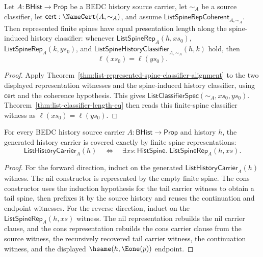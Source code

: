 \begin{theorem}
\label{thm:list-spine-classifier-represented-length}
Let $A:\mathsf{BHist}\to\mathsf{Prop}$ be a BEDC history source carrier, let
$\sim_A$ be a source classifier, let $\mathsf{cert}:\NameCert(A,\sim_A)$, and
assume $\mathsf{ListSpineRepCoherent}_{A,\sim_A}$. Then represented finite spines have equal presentation length along the spine-induced history classifier: whenever $\mathsf{ListSpineRep}_A(h,xs_0)$, $\mathsf{ListSpineRep}_A(k,ys_0)$, and $\mathsf{ListSpineHistoryClassifier}_{A,\sim_A}(h,k)$ hold, then
$$
\ell(xs_0)=\ell(ys_0).
$$
\end{theorem}
\begin{proof}
Apply Theorem~\ref{thm:list-represented-spine-classifier-alignment} to the two
displayed representation witnesses and the spine-induced history classifier,
using $\mathsf{cert}$ and the coherence hypothesis. This gives
$\mathsf{ListClassifierSpec}(\sim_A,xs_0,ys_0)$. Theorem~\ref{thm:list-classifier-length-eq}
then reads this finite-spine classifier witness as $\ell(xs_0)=\ell(ys_0)$.
\end{proof}

\begin{theorem}
\label{thm:list-spine-representation-coverage}
For every BEDC history source carrier $A:\mathsf{BHist}\to\mathsf{Prop}$ and
history $h$, the generated history carrier is covered exactly by finite spine
representations:
$$
\mathsf{ListHistoryCarrier}_A(h)
\quad\Longleftrightarrow\quad
\exists xs:\mathsf{HistSpine}.\;\mathsf{ListSpineRep}_A(h,xs).
$$
\end{theorem}
\begin{proof}
For the forward direction, induct on the generated
$\mathsf{ListHistoryCarrier}_A(h)$ witness. The nil constructor is represented by
the empty finite spine. The cons constructor uses the induction hypothesis for
the tail carrier witness to obtain a tail spine, then prefixes it by the source
history and reuses the continuation and endpoint witnesses. For the reverse
direction, induct on the $\mathsf{ListSpineRep}_A(h,xs)$ witness. The nil
representation rebuilds the nil carrier clause, and the cons representation
rebuilds the cons carrier clause from the source witness, the recursively
recovered tail carrier witness, the continuation witness, and the displayed
$\hsame(h,\Eone(p))$ endpoint.
\end{proof}

